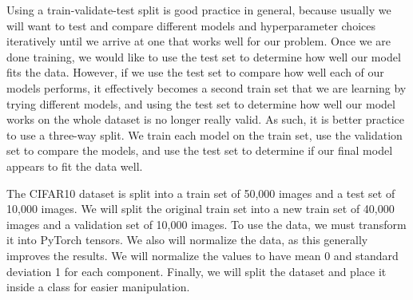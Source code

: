 Using a train-validate-test split is good practice in general, because usually we will want to test and compare different models and hyperparameter choices iteratively until we arrive at one that works well for our problem.
Once we are done training, we would like to use the test set to determine how well our model fits the data.
However, if we use the test set to compare how well each of our models performs, it effectively becomes a second train set that we are learning by trying different models, and using the test set to determine how well our model works on the whole dataset is no longer really valid.
As such, it is better practice to use a three-way split.
We train each model on the train set, use the validation set to compare the models, and use the test set to determine if our final model appears to fit the data well.

The CIFAR10 dataset is split into a train set of 50,000 images and a test set of 10,000 images. We will split the original train set into a new train set of 40,000 images and a validation set of 10,000 images.
To use the data, we must transform it into PyTorch tensors.
We also will normalize the data, as this generally improves the results.
We will normalize the values to have mean 0 and standard deviation 1 for each component.
Finally, we will split the dataset and place it inside a  class for easier manipulation.

